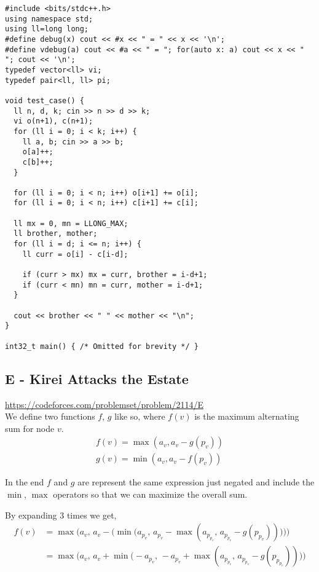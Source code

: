 \begin{verbatim}
#include <bits/stdc++.h>
using namespace std;
using ll=long long;
#define debug(x) cout << #x << " = " << x << '\n';
#define vdebug(a) cout << #a << " = "; for(auto x: a) cout << x << " "; cout << '\n';
typedef vector<ll> vi;
typedef pair<ll, ll> pi;

void test_case() {
  ll n, d, k; cin >> n >> d >> k;
  vi o(n+1), c(n+1);
  for (ll i = 0; i < k; i++) {
    ll a, b; cin >> a >> b;
    o[a]++;
    c[b]++;
  }

  for (ll i = 0; i < n; i++) o[i+1] += o[i];
  for (ll i = 0; i < n; i++) c[i+1] += c[i];

  ll mx = 0, mn = LLONG_MAX;
  ll brother, mother;
  for (ll i = d; i <= n; i++) {
    ll curr = o[i] - c[i-d];

    if (curr > mx) mx = curr, brother = i-d+1;
    if (curr < mn) mn = curr, mother = i-d+1;
  }

  cout << brother << " " << mother << "\n";
}

int32_t main() { /* Omitted for brevity */ }
\end{verbatim}

\subsection{E - Kirei Attacks the Estate}
\url{https://codeforces.com/problemset/problem/2114/E} \\
We define two functions $f$, $g$ like so, where $f(v)$ is the maximum alternating sum for node $v$.
\begin{equation}
\begin{matrix}
    f(v) = \max(a_v, a_v - g(p_v)) \\ 
    g(v) = \min(a_v, a_v - f(p_v))
\end{matrix}
\end{equation}

In the end $f$ and $g$ are represent the same expression just negated and include the $\min$, $\max$ operators so that we can maximize the overall sum. 

By expanding 3 times we get,
\begin{align*}
    f(v) &= \max\Big(a_v,\, a_v - \big(\min\big(a_{p_v},\, a_{p_v} - \max(a_{p_{p_v}},\, a_{p_{p_v}} - g(p_{p_v}))\big)\big)\Big)\\
    &= \max\Big(a_v,\, a_v + \min\big(-a_{p_v},\, -a_{p_v} + \max(a_{p_{p_v}},\, a_{p_{p_v}} - g(p_{p_{p_v}}))\big)\Big)
\end{align*}

